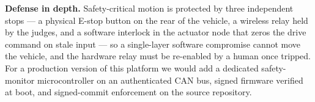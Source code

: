 \documentclass[12pt, letterpaper]{article}
\begin{document}
\textbf{Defense in depth.} Safety-critical motion is protected by three independent
stops --- a physical E-stop button on the rear of the vehicle, a wireless relay held
by the judges, and a software interlock in the actuator node that zeros the drive
command on stale input --- so a single-layer software compromise cannot move the
vehicle, and the hardware relay must be re-enabled by a human once tripped. For a
production version of this platform we would add a dedicated safety-monitor
microcontroller on an authenticated CAN bus, signed firmware verified at boot, and
signed-commit enforcement on the source repository.
\end{document}
